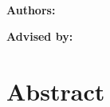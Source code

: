 \begin{titlepage}
  \centering
  {\Large \textbf{\project} \\[6pt] }\par\vspace{1.25cm}
  {\large \course\\\semester\\\institution}\par\vspace{0.25cm}
  {\large \textbf{Authors:}\\ \teammembers}\par\vspace{0.05cm}
  {\large \textbf{Advised by:}\\ \advisors}\par\vspace{0.05cm}


\section*{Abstract}



  \end{titlepage}